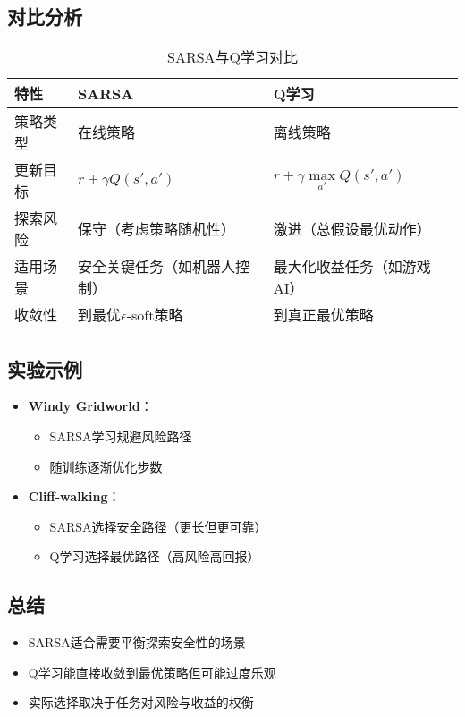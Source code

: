 \subsection{对比分析}
\begin{table}[H]
\centering
\caption{SARSA与Q学习对比}
\begin{tabular}{lll}  %
\toprule
\textbf{特性} & \textbf{SARSA} & \textbf{Q学习} \\
\midrule
策略类型 & 在线策略 & 离线策略 \\
更新目标 & $r+\gamma Q(s',a')$ & $r+\gamma \max\limits_{a'}Q(s',a')$ \\
探索风险 & 保守（考虑策略随机性） & 激进（总假设最优动作） \\
适用场景 & 安全关键任务（如机器人控制） & 最大化收益任务（如游戏AI） \\
收敛性 & 到最优$\epsilon$-soft策略 & 到真正最优策略 \\
\bottomrule
\end{tabular}
\label{tab:sarsa_vs_q}
\end{table}

\subsection{实验示例}
\begin{itemize}
    \item \textbf{Windy Gridworld}：
        \begin{itemize}
            \item SARSA学习规避风险路径
            \item 随训练逐渐优化步数
        \end{itemize}
    \item \textbf{Cliff-walking}：
        \begin{itemize}
            \item SARSA选择安全路径（更长但更可靠）
            \item Q学习选择最优路径（高风险高回报）
        \end{itemize}
\end{itemize}

\subsection{总结}
\begin{itemize}
    \item SARSA适合需要平衡探索安全性的场景
    \item Q学习能直接收敛到最优策略但可能过度乐观
    \item 实际选择取决于任务对风险与收益的权衡
\end{itemize}

